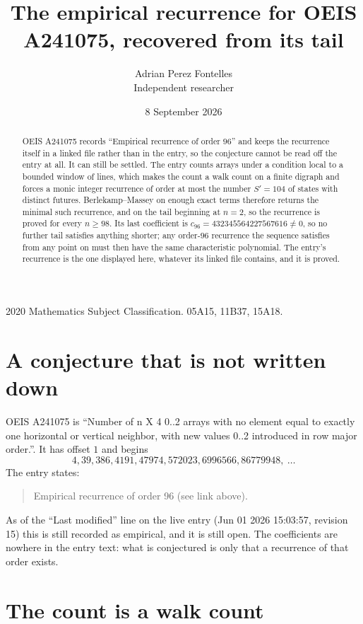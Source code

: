 \documentclass[11pt,a4paper]{article}
\title{The empirical recurrence for OEIS A241075, recovered from its tail}
\author{Adrian Perez Fontelles\\ \small Independent researcher}
\date{8 September 2026}
\theoremstyle{plain}
\theoremstyle{definition}
\begin{document}
\maketitle

\begin{abstract}
OEIS A241075 records ``Empirical recurrence of order $96$'' and keeps the recurrence itself in
a linked file rather than in the entry, so the conjecture cannot be read off the entry at all.
It can still be settled. The entry counts arrays under a condition local to a bounded window of
lines, which makes the count a walk count on a finite digraph and forces a monic integer
recurrence of order at most the number $S'=104$ of states with distinct futures. Berlekamp--Massey on
enough exact terms therefore returns the minimal such recurrence, and on the tail beginning at $n=2$, so the recurrence is proved for every $n\ge98$.
Its last coefficient is $c_{96}=432345564227567616\neq0$, so no further tail satisfies anything
shorter; any order-$96$ recurrence the sequence satisfies from any point on must then have
the same characteristic polynomial. The entry's recurrence is the one displayed here, whatever
its linked file contains, and it is proved.
\end{abstract}

\noindent\small 2020 Mathematics Subject Classification. 05A15, 11B37, 15A18.\normalsize

\section{A conjecture that is not written down}

OEIS A241075 is ``Number of n X 4 0..2 arrays with no element equal to exactly one horizontal or vertical neighbor, with new values 0..2 introduced in row major order.''. It has offset $1$ and begins
\[
4, 39, 386, 4191, 47974, 572023, 6996566, 86779948,\ \dots
\]
The entry states:
\begin{quote}
Empirical recurrence of order 96 (see link above).
\end{quote}
As of the ``Last modified'' line on the live entry (Jun 01 2026 15:03:57, revision 15)
this is still recorded as empirical, and it is still open. The coefficients are nowhere in the
entry text: what is conjectured is only that a recurrence of that order exists.

\section{The count is a walk count}
\end{document}
